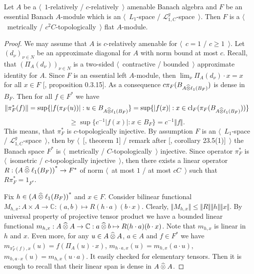 \begin{proposition}\label{MetTopEssL1FlatModAoverAmenBanAlg} Let $A$ be a
$\langle$~$1$-relatively / $c$-relatively~$\rangle$ amenable Banach algebra and
$F$ be an essential Banach $A$-module which is an $\langle$~$L_1$-space /
$\mathscr{L}_{1,C}^g$-space~$\rangle$. Then $F$ is a $\langle$~metrically /
$c^2C$-topologically~$\rangle$ flat $A$-module.
\end{proposition}
\begin{proof} We may assume that $A$ is $c$-relatively amenable for
$\langle$~$c=1$ / $c\geq 1$~$\rangle$. Let ${(d_\nu)}_{\nu\in N}$ be an
approximate diagonal for $A$ with norm bound at most $c$. Recall, that
${(\Pi_A(d_\nu))}_{\nu\in N}$ is a two-sided $\langle$~contractive /
bounded~$\rangle$ approximate identity for $A$. Since $F$ is an essential left
$A$-module, then $\lim_{\nu}\Pi_A(d_\nu)\cdot x=x$ for all $x\in F$
[\cite{HelHomolBanTopAlg}, proposition 0.3.15]. As a consequence
$c\pi_F(B_{A\mathbin{\widehat{\otimes}}\ell_1(B_F)})$ is dense in $B_F$. Then for all $f\in F^*$
we have
$$
\Vert\pi_F^*(f)\Vert
=\sup \{|f(\pi_F(u))|:u\in B_{A\mathbin{\widehat{\otimes}}\ell_1(B_F)} \}
=\sup \{|f(x)|:x\in \operatorname{cl}_F(\pi_F(B_{A\mathbin{\widehat{\otimes}}\ell_1(B_F)})) \}
$$
$$
\geq\sup \{c^{-1}|f(x)|:x\in B_F \}=c^{-1}\Vert f\Vert.
$$
This means, that $\pi_F^*$ is $c$-topologically injective. By assumption $F$ is
an $\langle$~$L_1$-space / $\mathscr{L}_{1,C}^g$-space~$\rangle$, then by
$\langle$~[\cite{GrothMetrProjFlatBanSp}, theorem 1] / remark after
[\cite{DefFloTensNorOpId}, corollary 23.5(1)]~$\rangle$ the Banach space $F^*$
is $\langle$~metrically / $C$-topologically~$\rangle$ injective. Since operator
$\pi_F^*$ is $\langle$~isometric / $c$-topologically injective~$\rangle$, then
there exists a linear operator $R:{(A\mathbin{\widehat{\otimes}}\ell_1(B_F))}^*\to F^*$ of norm
$\langle$~at most $1$ / at most $cC$~$\rangle$ such that $R\pi_F^*=1_{F^*}$.

Fix $h\in {(A\mathbin{\widehat{\otimes}}\ell_1(B_F))}^*$ and $x\in F$. Consider bilinear
functional $M_{h,x}:A\times A\to\mathbb{C}:(a,b)\mapsto R(h\cdot a)(b\cdot x)$.
Clearly, $\Vert M_{h,x}\Vert\leq\Vert R\Vert\Vert h\Vert\Vert x\Vert$. By
universal property of projective tensor product we have a bounded linear
functional 
$m_{h,x}:A\mathbin{\widehat{\otimes}} A\to\mathbb{C}:a\mathbin{\widehat{\otimes}} b\mapsto R(h\cdot a)(b\cdot x)$. 
Note that $m_{h,x}$ is linear in $h$ and $x$. Even more, for any
$u\in A\mathbin{\widehat{\otimes}} A$, $a\in A$ and $f\in F^*$ we have
$m_{\pi_F^*(f),x}(u)=f(\Pi_A(u)\cdot x)$, $m_{h\cdot a,x}(u)=m_{h,x}(a\cdot u)$,
$m_{h,a\cdot x}(u)=m_{h,x}(u\cdot a)$. It easily checked for elementary tensors.
Then it is enough to recall that their linear span is dense in $A\mathbin{\widehat{\otimes}} A$.


\end{proof}
